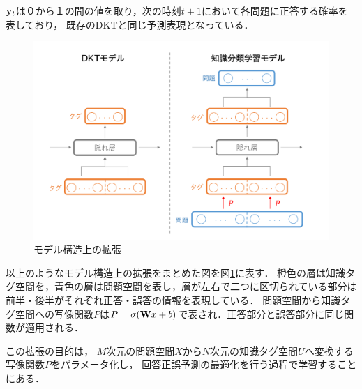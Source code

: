 ${\bf y}_t$は０から１の間の値を取り，次の時刻$t+1$において各問題に正答する確率を表しており，
既存のDKTと同じ予測表現となっている．


\begin{figure}[htb]
\begin{center}
	\includegraphics[width=360pt]{./img/model.png}
	\caption{モデル構造上の拡張}
	\label{fig:model}
\end{center}
\end{figure}

以上のようなモデル構造上の拡張をまとめた図を図\ref{fig:model}に表す．
橙色の層は知識タグ空間を，青色の層は問題空間を表し，層が左右で二つに区切られている部分は前半・後半がそれぞれ正答・誤答の情報を表現している．
問題空間から知識タグ空間への写像関数$P$は$P=\sigma({\bf W} x + b)$で表され．正答部分と誤答部分に同じ関数が適用される．

この拡張の目的は，
$M$次元の問題空間$X$から$N$次元の知識タグ空間$U$へ変換する写像関数$P$をパラメータ化し，
回答正誤予測の最適化を行う過程で学習することにある．




